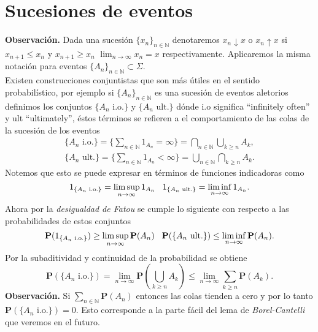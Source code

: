 \documentclass[letterpaper]{article}
\newcommand{\nat}{\ensuremath{ \mathbb N }}
\newcommand{\prob}{\textbf{P}}
\newcommand{\obs}{{\newline \noindent \sc \textbf{Observación. }}}
\newcommand{\sig}{\ensuremath{\Sigma}}
\begin{document}
\section{Sucesiones de eventos}
\label{sec:org4c7592e}
\obs Dada una sucesión \(\{x_n\}_{n\in\nat}\) denotaremos \(x_n\downarrow x\) o \(x_n\uparrow x\) si \(x_{n+1}\leq x_n\) y \(x_{n+1}\geq x_n\) \(\lim_{n\rightarrow\infty}x_n=x\) respectivamente. Aplicaremos la misma notación para eventos \(\{A_n\}_{n\in\nat}\subset\sig\).\\[0pt]
Existen construcciones conjuntistas que son más útiles en el sentido probabilístico, por ejemplo si \(\{A_n\}_{n\in\nat}\) es una sucesión de eventos aletorios definimos los conjuntos \(\{A_n\text{ i.o.}\}\) y \(\{A_n\text{ ult.}\}\) dónde i.o significa ``infinitely often'' y ult ``ultimately'', éstos términos se refieren a el comportamiento de las colas de la sucesión de los eventos
\begin{align*}
\{A_n\text{ i.o.}\}=\Big\{\sum_{n\in\nat}1_{A_n}=\infty\Big\}=\bigcap_{n\in\nat}\bigcup_{k\geq n}A_k,\\
\{A_n\text{ ult.}\}=\Big\{\sum_{n\in\nat}1_{A_n}<\infty\Big\}=\bigcup_{n\in\nat}\bigcap_{k\geq n}A_k.
\end{align*}
\noindent Notemos que esto se puede expresar en términos de funciones indicadoras como
\[
1_{\{A_n\text{ i.o.}\}}=\limsup_{n\rightarrow\infty}1_{A_n} \hspace{0.3cm} 1_{\{A_n\text{ ult.}\}}=\liminf_{n\rightarrow\infty}1_{A_n}.
\]
\noindent Ahora por la \emph{desigualdad de Fatou} se cumple lo siguiente con respecto a las probabilidades de estos conjuntos
\[
\prob(1_{\{A_n\text{ i.o.}\}})\geq\limsup_{n\rightarrow\infty}\prob(A_n)\hspace{0.3cm} \prob({\{A_n\text{ ult.}\}})\leq\liminf_{n\rightarrow\infty}\prob(A_n).
\]
\noindent Por la subaditividad y continuidad de la probabilidad se obtiene
\[
 \prob(\{A_n\text{ i.o.}\})=\lim_{n\rightarrow\infty}\prob(\bigcup_{k\geq n} A_k)\leq\lim_{n\rightarrow\infty}\sum_{k\geq n}\prob(A_k).
\]
\obs Si \(\sum_{n\in\nat}\prob(A_n)\) entonces las colas tienden a cero y por lo tanto \(\prob(\{A_n\text{ i.o.}\})=0\). Esto corresponde a la parte fácil del lema de \emph{Borel-Cantelli} que veremos en el futuro.
\end{document}
